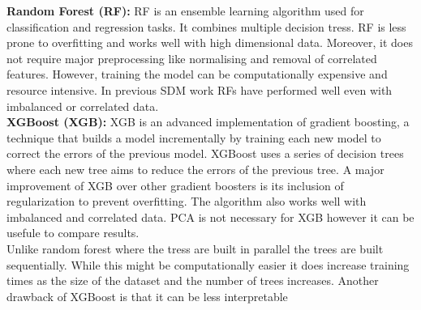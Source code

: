 \documentclass{article}
\begin{document}
\textbf{Random Forest (RF):} RF is an ensemble learning algorithm used for classification and regression tasks. It combines multiple decision tress. RF is less prone to overfitting and works well with high dimensional data. Moreover, it does not require major preprocessing like normalising and removal of correlated features. However, training the model can be computationally expensive and resource intensive. In previous SDM work RFs have performed well even with imbalanced or correlated data.\\
\textbf{XGBoost (XGB):} XGB is an advanced implementation of gradient boosting, a technique that builds a model incrementally by training each new model to correct the errors of the previous model.  XGBoost uses a series of decision trees where each new tree aims to reduce the errors of the previous tree. A major improvement of XGB over other gradient boosters is its inclusion of regularization to prevent overfitting. The algorithm also works well with imbalanced and correlated data. PCA is not necessary for XGB however it can be usefule to compare results.\\

Unlike random forest where the tress are built in parallel the trees are built sequentially. While this might be computationally easier it does increase training times as the size of the dataset and the number of trees increases. Another drawback of XGBoost is that it can be less interpretable \\
\end{document}
